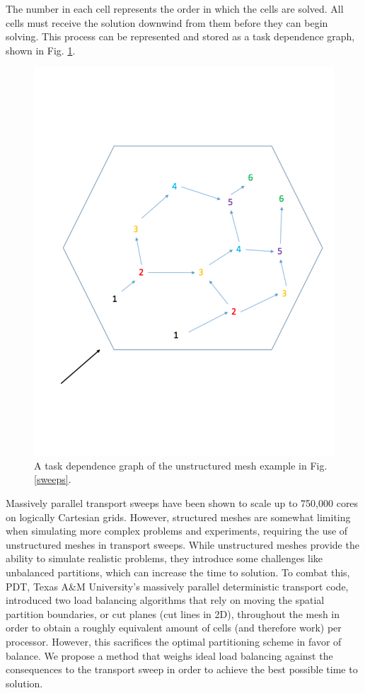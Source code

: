 The number in each cell represents the order in which the cells are solved. All cells must receive the solution downwind from them before they can begin solving. This process can be represented and stored as a task dependence graph, shown in Fig. \ref{tdg}.

\begin{figure}[H]
\centering
\includegraphics[scale = 0.35,trim={0cm 3cm 0cm 3cm},clip]{../figures/tdg.pdf}
\caption{A task dependence graph of the unstructured mesh example in Fig. \ref{sweeps}.}
\label{tdg}
\end{figure}

Massively parallel transport sweeps have been shown to scale up to 750,000 cores on logically Cartesian grids. However, structured meshes are somewhat limiting when  simulating more complex problems and experiments, requiring the use of unstructured meshes in transport sweeps. While unstructured meshes provide the ability to simulate realistic problems, they introduce some challenges like unbalanced partitions, which can increase the time to solution. To combat this, PDT, Texas A\&M University's massively parallel deterministic transport code, introduced two load balancing algorithms that rely on moving the spatial partition boundaries, or cut planes (cut lines in 2D), throughout the mesh in order to obtain a roughly equivalent amount of cells (and therefore work) per processor. However, this sacrifices the optimal partitioning scheme\cite{mpadams2013} in favor of balance. We propose a method that weighs ideal load balancing against the consequences to the transport sweep in order to achieve the best possible time to solution.


